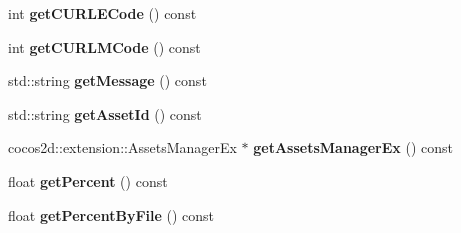 \begin{DoxyCompactItemize}
\item 
\mbox{\label{classEventAssetsManagerEx_ab184fe2408824ff6d2e16532718df889}} 
int {\bfseries get\+C\+U\+R\+L\+E\+Code} () const
\item 
\mbox{\label{classEventAssetsManagerEx_a9c181d66c5f5214f1f274096d64c5a6e}} 
int {\bfseries get\+C\+U\+R\+L\+M\+Code} () const
\item 
\mbox{\label{classEventAssetsManagerEx_ad9742b1cdb51d66e5feafe002594a066}} 
std\+::string {\bfseries get\+Message} () const
\item 
\mbox{\label{classEventAssetsManagerEx_a7d9e014e90e71a8ab373295241148fec}} 
std\+::string {\bfseries get\+Asset\+Id} () const
\item 
\mbox{\label{classEventAssetsManagerEx_a3543c086aebfeb351deac30147035b63}} 
cocos2d\+::extension\+::\+Assets\+Manager\+Ex $\ast$ {\bfseries get\+Assets\+Manager\+Ex} () const
\item 
\mbox{\label{classEventAssetsManagerEx_a16c07316d5e4ffe4ea28a91394cd8d82}} 
float {\bfseries get\+Percent} () const
\item 
\mbox{\label{classEventAssetsManagerEx_a1c790296467dc25b3a15c9ba8ccbccc6}} 
float {\bfseries get\+Percent\+By\+File} () const
\end{DoxyCompactItemize}
